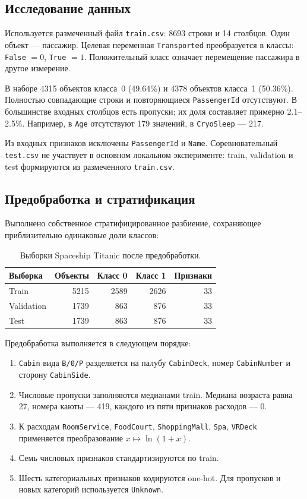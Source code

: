 \documentclass[a4paper,12pt]{article}
\newcommand{\code}[1]{\texttt{#1}}
\begin{document}
\subsection{Исследование данных}

Используется размеченный файл \code{train.csv}:
8693 строки и 14 столбцов. Один объект --- пассажир.
Целевая переменная \code{Transported} преобразуется в классы:
\code{False} $=0$, \code{True} $=1$.
Положительный класс означает перемещение пассажира в другое измерение.

В наборе 4315 объектов класса~0 (49.64\%) и 4378 объектов класса~1
(50.36\%). Полностью совпадающие строки и повторяющиеся
\code{PassengerId} отсутствуют. В большинстве входных столбцов есть
пропуски; их доля составляет примерно 2.1--2.5\%.
Например, в \code{Age} отсутствуют 179 значений, в \code{CryoSleep} --- 217.

Из входных признаков исключены \code{PassengerId} и \code{Name}.
Соревновательный \code{test.csv} не участвует в основном локальном
эксперименте: train, validation и test формируются из размеченного
\code{train.csv}.

\subsection{Предобработка и стратификация}

Выполнено собственное стратифицированное разбиение, сохраняющее
приблизительно одинаковые доли классов:
\begin{table}[H]
    \centering
    \caption{Выборки Spaceship Titanic после предобработки.}
    \begin{tabular}{lrrrr}
        \toprule
        Выборка & Объекты & Класс 0 & Класс 1 & Признаки\\
        \midrule
        Train & 5215 & 2589 & 2626 & 33\\
        Validation & 1739 & 863 & 876 & 33\\
        Test & 1739 & 863 & 876 & 33\\
        \bottomrule
    \end{tabular}
\end{table}

Предобработка выполняется в следующем порядке:
\begin{enumerate}
    \item \code{Cabin} вида \code{B/0/P} разделяется на палубу
    \code{CabinDeck}, номер \code{CabinNumber} и сторону \code{CabinSide}.
    \item Числовые пропуски заполняются медианами train.
    Медиана возраста равна 27, номера каюты --- 419,
    каждого из пяти признаков расходов --- 0.
    \item К расходам \code{RoomService}, \code{FoodCourt},
    \code{ShoppingMall}, \code{Spa}, \code{VRDeck}
    применяется преобразование $x\mapsto\ln(1+x)$.
    \item Семь числовых признаков стандартизируются по train.
    \item Шесть категориальных признаков кодируются one-hot.
    Для пропусков и новых категорий используется \code{Unknown}.
\end{enumerate}
\end{document}
